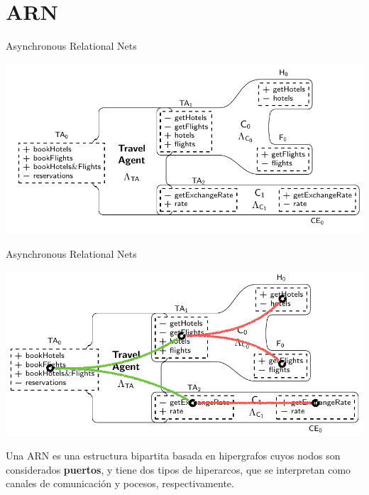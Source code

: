 \documentclass[10pt,xcolor={table,dvipsnames},t]{beamer}
\begin{document}
\section{ARN}

\begin{frame}{Asynchronous Relational Nets}
 \vspace{\fill}
\begin{center}
\includegraphics[scale=0.5]{images/ARN0.png}
\end{center}
 \vspace{\fill}
\end{frame}

\begin{frame}{Asynchronous Relational Nets \cite{fiadeiro:fase2011}}
 \vspace{\fill}
\begin{center}
\includegraphics[scale=0.5]{images/ARN1.png}
\end{center}
 \vspace{\fill}
Una ARN es una estructura bipartita basada en hipergrafos cuyos nodos son considerados \textbf{puertos}, y tiene dos tipos de hiperarcos, que se interpretan como \textcolor{com}{canales de comunicación} y \textcolor{proc}{pocesos}, respectivamente.
 \vspace{\fill}
\end{frame}
\end{document}
